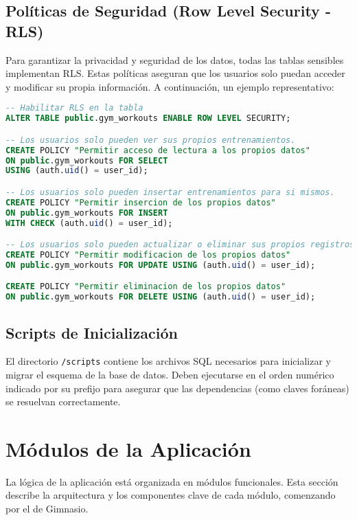 \documentclass[12pt,a4paper]{article}
\begin{document}
\subsection{Políticas de Seguridad (Row Level Security - RLS)}

Para garantizar la privacidad y seguridad de los datos, todas las tablas sensibles implementan RLS. Estas políticas aseguran que los usuarios solo puedan acceder y modificar su propia información. A continuación, un ejemplo representativo:

\begin{lstlisting}[language=sql, caption={Ejemplo de políticas RLS para la tabla \texttt{gym\_workouts}}]
-- Habilitar RLS en la tabla
ALTER TABLE public.gym_workouts ENABLE ROW LEVEL SECURITY;

-- Los usuarios solo pueden ver sus propios entrenamientos.
CREATE POLICY "Permitir acceso de lectura a los propios datos" 
ON public.gym_workouts FOR SELECT 
USING (auth.uid() = user_id);

-- Los usuarios solo pueden insertar entrenamientos para si mismos.
CREATE POLICY "Permitir insercion de los propios datos" 
ON public.gym_workouts FOR INSERT 
WITH CHECK (auth.uid() = user_id);

-- Los usuarios solo pueden actualizar o eliminar sus propios registros.
CREATE POLICY "Permitir modificacion de los propios datos" 
ON public.gym_workouts FOR UPDATE USING (auth.uid() = user_id);

CREATE POLICY "Permitir eliminacion de los propios datos" 
ON public.gym_workouts FOR DELETE USING (auth.uid() = user_id);
\end{lstlisting}

\subsection{Scripts de Inicialización}

El directorio \texttt{/scripts} contiene los archivos SQL necesarios para inicializar y migrar el esquema de la base de datos. Deben ejecutarse en el orden numérico indicado por su prefijo para asegurar que las dependencias (como claves foráneas) se resuelvan correctamente.

\section{Módulos de la Aplicación}

La lógica de la aplicación está organizada en módulos funcionales. Esta sección describe la arquitectura y los componentes clave de cada módulo, comenzando por el de Gimnasio.
\end{document}
